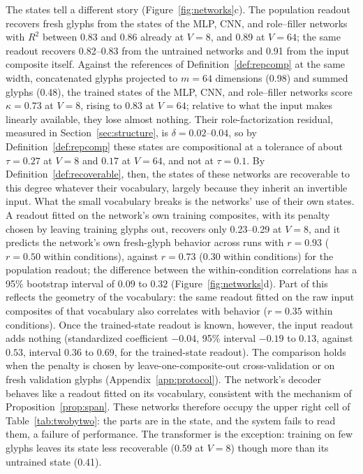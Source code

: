 \documentclass[10pt]{article}
\theoremstyle{plain}
\theoremstyle{remark}
\begin{document}
The states tell a different story (Figure~\ref{fig:networks}c). The population readout recovers fresh glyphs from the states of the MLP, CNN, and role--filler networks with $R^2$ between 0.83 and 0.86 already at $V = 8$, and 0.89 at $V = 64$; the same readout recovers 0.82--0.83 from the untrained networks and 0.91 from the input composite itself. Against the references of Definition~\ref{def:repcomp} at the same width, concatenated glyphs projected to $m = 64$ dimensions (0.98) and summed glyphs (0.48), the trained states of the MLP, CNN, and role--filler networks score $\kappa = 0.73$ at $V = 8$, rising to $0.83$ at $V = 64$; relative to what the input makes linearly available, they lose almost nothing. Their role-factorization residual, measured in Section~\ref{sec:structure}, is $\delta = 0.02$--$0.04$, so by Definition~\ref{def:repcomp} these states are compositional at a tolerance of about $\tau = 0.27$ at $V = 8$ and $0.17$ at $V = 64$, and not at $\tau = 0.1$. By Definition~\ref{def:recoverable}, then, the states of these networks are recoverable to this degree whatever their vocabulary, largely because they inherit an invertible input. What the small vocabulary breaks is the networks' use of their own states. A readout fitted on the network's own training composites, with its penalty chosen by leaving training glyphs out, recovers only 0.23--0.29 at $V = 8$, and it predicts the network's own fresh-glyph behavior across runs with $r = 0.93$ ($r = 0.50$ within conditions), against $r = 0.73$ ($0.30$ within conditions) for the population readout; the difference between the within-condition correlations has a 95\% bootstrap interval of $0.09$ to $0.32$ (Figure~\ref{fig:networks}d). Part of this reflects the geometry of the vocabulary: the same readout fitted on the raw input composites of that vocabulary also correlates with behavior ($r = 0.35$ within conditions). Once the trained-state readout is known, however, the input readout adds nothing (standardized coefficient $-0.04$, 95\% interval $-0.19$ to $0.13$, against $0.53$, interval $0.36$ to $0.69$, for the trained-state readout). The comparison holds when the penalty is chosen by leave-one-composite-out cross-validation or on fresh validation glyphs (Appendix~\ref{app:protocol}). The network's decoder behaves like a readout fitted on its vocabulary, consistent with the mechanism of Proposition~\ref{prop:span}. These networks therefore occupy the upper right cell of Table~\ref{tab:twobytwo}: the parts are in the state, and the system fails to read them, a failure of performance. The transformer is the exception: training on few glyphs leaves its state less recoverable (0.59 at $V = 8$) though more than its untrained state (0.41).
\end{document}
